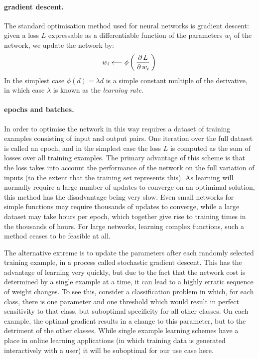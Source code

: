 \documentclass[msc]{infthesis}
\newcommand{\of}[1]{\left(\,{#1}\,\right)}
\begin{document}
\paragraph*{gradient descent.}
The standard optimisation method used for neural networks is gradient descent: given a loss \(L\) expressable
as a differentiable function of the parameters \(w_i\) of the network, we update the network by:
%
\begin{align}
  \label{eq:gradient-descent}
w_i \longleftarrow \phi\of{ \derivative[L]{w_i} }
\end{align}
%
In the simplest case \(\phi(d) = \lambda d\) is a simple constant multiple of the derivative, in which
case \(\lambda\) is known as the \emph{learning rate}.


\paragraph*{epochs and batches.}
In order to optimise the network in this way requires a dataset of training examples consisting of input 
and output pairs.    
%
One iteration over the full dataset is called an epoch, and in the simplest case the loss \(L\)
is computed as the sum of losses over all training examples. The primary advantage of this
scheme is that the loss takes into account the performance of the network on the full variation
of inputs (to the extent that the training set represents this).
%
As learning will normally require a large number of updates to converge on an optimimal
solution, this method has the disadvantage being very slow.  Even small networks for simple
functions may require thousands of updates to converge, while a large dataset may take hours per
epoch, which together give rise to training times in the thousands of hours.  For large
networks, learning complex functions, such a method ceases to be feasible at all.

The alternative extreme is to update the parameters after each randomly selected training example, in a
process called stochastic gradient descent.
%
This has the advantage of learning very quickly, but due to the fact that the network cost is
determined by a single example at a time, it can lead to a highly erratic sequence of weight
changes.  To see this, consider a classification problem in which, for each class, there is one
parameter and one threshold which would result in perfect sensitivity to that class, but
suboptimal specificity for all other classes.  On each example, the optimal gradient results in
a change to this parameter, but to the detriment of the other classes.  While single example
learning schemes have a place in online learning applications (in which training data is
generated interactively with a user) it will be suboptimal for our use case here.
\end{document}
